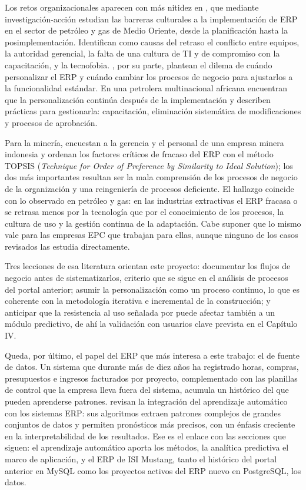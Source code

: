 Los retos organizacionales aparecen con más nitidez en \textcite{Ali2023}, que mediante investigación-acción estudian las barreras culturales a la implementación de ERP en el sector de petróleo y gas de Medio Oriente, desde la planificación hasta la posimplementación. Identifican como causas del retraso el conflicto entre equipos, la autoridad gerencial, la falta de una cultura de TI y de compromiso con la capacitación, y la tecnofobia. \textcite{Gool2018}, por su parte, plantean el dilema de cuándo personalizar el ERP y cuándo cambiar los procesos de negocio para ajustarlos a la funcionalidad estándar. En una petrolera multinacional africana encuentran que la personalización continúa después de la implementación y describen prácticas para gestionarla: capacitación, eliminación sistemática de modificaciones y procesos de aprobación.

Para la minería, \textcite{Larasati2023} encuestan a la gerencia y el personal de una empresa minera indonesia y ordenan los factores críticos de fracaso del ERP con el método TOPSIS (\textit{Technique for Order of Preference by Similarity to Ideal Solution}); los dos más importantes resultan ser la mala comprensión de los procesos de negocio de la organización y una reingeniería de procesos deficiente. El hallazgo coincide con lo observado en petróleo y gas: en las industrias extractivas el ERP fracasa o se retrasa menos por la tecnología que por el conocimiento de los procesos, la cultura de uso y la gestión continua de la adaptación. Cabe suponer que lo mismo vale para las empresas EPC que trabajan para ellas, aunque ninguno de los casos revisados las estudia directamente.

Tres lecciones de esa literatura orientan este proyecto: documentar los flujos de negocio antes de sistematizarlos, criterio que se sigue en el análisis de procesos del portal anterior; asumir la personalización como un proceso continuo, lo que es coherente con la metodología iterativa e incremental de la construcción; y anticipar que la resistencia al uso señalada por \textcite{Ali2023} puede afectar también a un módulo predictivo, de ahí la validación con usuarios clave prevista en el Capítulo IV\@.

Queda, por último, el papel del ERP que más interesa a este trabajo: el de fuente de datos. Un sistema que durante más de diez años ha registrado horas, compras, presupuestos e ingresos facturados por proyecto, complementado con las planillas de control que la empresa lleva fuera del sistema, acumula un histórico del que pueden aprenderse patrones. \textcite{MLdrivenERP2023} revisan la integración del aprendizaje automático con los sistemas ERP: sus algoritmos extraen patrones complejos de grandes conjuntos de datos y permiten pronósticos más precisos, con un énfasis creciente en la interpretabilidad de los resultados. Ese es el enlace con las secciones que siguen: el aprendizaje automático aporta los métodos, la analítica predictiva el marco de aplicación, y el ERP de ISI Mustang, tanto el histórico del portal anterior en MySQL como los proyectos activos del ERP nuevo en PostgreSQL, los datos.
